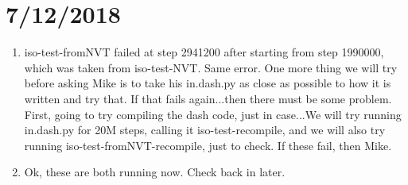 \documentclass[12pt,reqno]{amsart}
\numberwithin{equation}{section}
\begin{document}
\section{7/12/2018}
\begin{enumerate}
\item iso-test-fromNVT failed at step 2941200 after starting from step 1990000, which was taken from iso-test-NVT.  Same error.  One more thing we will try before asking Mike is to take his in.dash.py as close as possible to how it is written and try that.  If that fails again...then there must be some problem.  First, going to try compiling the dash code, just in case...We will try running in.dash.py for 20M steps, calling it iso-test-recompile, and we will also try running iso-test-fromNVT-recompile, just to check.  If these fail, then Mike.  
\item Ok, these are both running now.  Check back in later.  
\end{enumerate}
\end{document}
